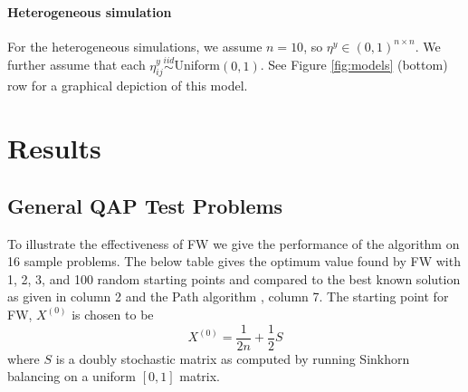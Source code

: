 \paragraph{Heterogeneous simulation} %
\label{par:homogeneous_kidney_egg_simulation}

For the heterogeneous simulations, we assume $n=10$, so $\eta^y \in (0,1)^{n\times n}$.  We further assume that each $\eta_{ij}^y \overset{iid}{\sim}$Uniform$(0,1)$.  See Figure \ref{fig:models} (bottom) row for a graphical depiction of this model.










\section{Results} %
\label{sec:results}


\subsection{General QAP Test Problems}
To illustrate the effectiveness of FW 
we give the performance of the algorithm on 16 sample problems.  The below table gives the optimum value found by FW with 1, 2, 3, and 100 random starting points   and compared 
to the best known solution as given in column 2 and the Path algorithm  \cite{Path:2009}, column 7.   The starting point for FW, $X^{(0)}$ is chosen to be
$$X^{(0)}=\frac {1}{2n} + \frac{1}{2} S$$
where $S$ is a doubly stochastic matrix as computed by running Sinkhorn balancing on a uniform $[0,1]$ matrix.

